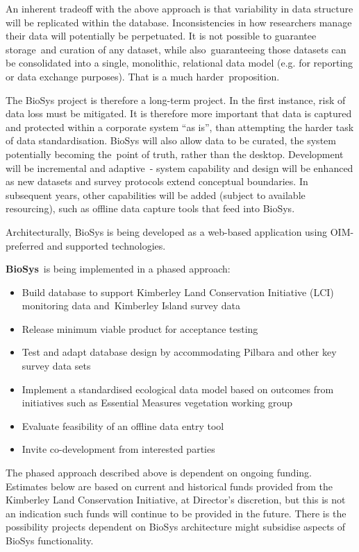 \documentclass[version=last,
    paper=a4,                               %
    10pt,                                   %
    dvipsnames,
    oneside,                              %
    headings=openany,                       %
    open=any,
    BCOR=7mm,                               %
    DIV=15,     %
]{scrbook}
\begin{document}
An inherent tradeoff with the above approach is that variability in data
structure will be replicated within the database. Inconsistencies in how
researchers manage their data will potentially be perpetuated. It is not
possible to guarantee storage~and curation of any dataset, while
also~guaranteeing those datasets can be consolidated into a single,
monolithic, relational data model (e.g. for reporting or data exchange
purposes). That is a much harder~proposition.

The BioSys project is therefore a long-term project. In the first
instance, risk of data loss must be mitigated. It is therefore more
important that data is captured and protected within a corporate system
``as is'', than attempting the harder task of data standardisation.
BioSys will also allow data to be curated, the system potentially
becoming the~point of truth, rather than the desktop. Development will
be incremental and adaptive~- system capability and design will be
enhanced as new datasets and survey protocols extend conceptual
boundaries. In subsequent years, other capabilities will be added
(subject to available resourcing), such as offline data capture tools
that feed into BioSys.

Architecturally, BioSys is being developed as a web-based application
using OIM-preferred and supported technologies.

\textbf{BioSys}~is being implemented in a phased approach:

\begin{itemize}
\itemsep1pt\parskip0pt
\item
  Build database to support Kimberley Land Conservation Initiative (LCI)
  monitoring data and~Kimberley Island survey data
\item
  Release minimum viable product for acceptance testing
\item
  Test and adapt database design by accommodating Pilbara and other key
  survey data sets
\item
  Implement a standardised ecological data model based on outcomes from
  initiatives such as Essential Measures vegetation working group
\item
  Evaluate feasibility of an offline data entry tool
\item
  Invite co-development from interested parties
\end{itemize}

The phased approach described above is dependent on ongoing funding.
Estimates below are based on current and historical funds provided from
the Kimberley Land Conservation Initiative, at Director's discretion,
but this is not an indication such funds will continue to be provided in
the future. There is the possibility projects dependent on BioSys
architecture might subsidise aspects of BioSys functionality.
\end{document}
